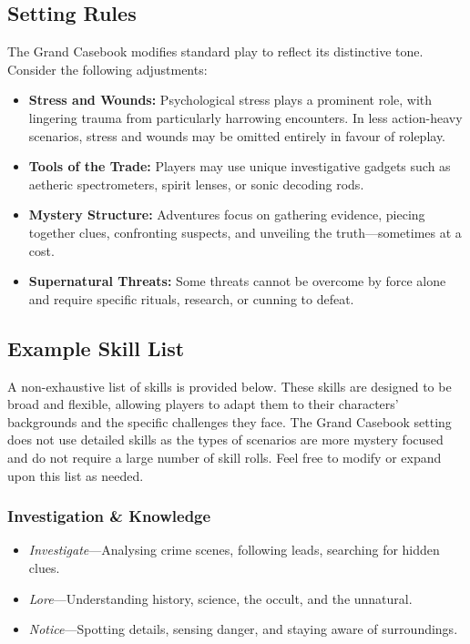\subsection{Setting Rules}

The Grand Casebook modifies standard play to reflect its distinctive tone. Consider the following adjustments:

\begin{itemize}\raggedright
    \item \textbf{Stress and Wounds:} Psychological stress plays a prominent role, with lingering trauma from particularly harrowing encounters. In less action-heavy scenarios, stress and wounds may be omitted entirely in favour of roleplay.
    
    \item \textbf{Tools of the Trade:} Players may use unique investigative gadgets such as aetheric spectrometers, spirit lenses, or sonic decoding rods.
    
    \item \textbf{Mystery Structure:} Adventures focus on gathering evidence, piecing together clues, confronting suspects, and unveiling the truth—sometimes at a cost.
    
    \item \textbf{Supernatural Threats:} Some threats cannot be overcome by force alone and require specific rituals, research, or cunning to defeat.
\end{itemize}

\subsection{Example Skill List}

A non-exhaustive list of skills is provided below. These skills are designed to be broad and flexible, allowing players to adapt them to their characters' backgrounds and the specific challenges they face. The Grand Casebook setting does not use detailed skills as the types of scenarios are more mystery focused and do not require a large number of skill rolls. Feel free to modify or expand upon this list as needed.

\subsubsection*{Investigation \& Knowledge}  
\begin{itemize}\raggedright
    \item \emph{Investigate}---Analysing crime scenes, following leads, searching for hidden clues.
    \item \emph{Lore}---Understanding history, science, the occult, and the unnatural.
    \item \emph{Notice}---Spotting details, sensing danger, and staying aware of surroundings.
\end{itemize}

